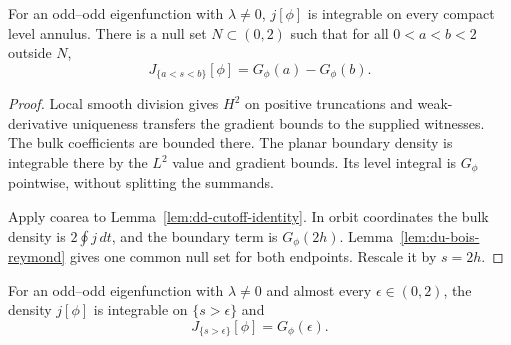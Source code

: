 \begin{lemma}
\label{lem:dd-annular-virial}
\leanok
For an odd--odd eigenfunction with $\lambda\ne0$, $j[\phi]$ is integrable
on every compact level annulus. There is a null set $N\subset(0,2)$ such
that for all $0<a<b<2$ outside $N$,
\[
 J_{\{a<s<b\}}[\phi]=G_\phi(a)-G_\phi(b).
\]
\end{lemma}

\begin{proof}
\leanok
Local smooth division gives $H^2$ on positive truncations and
weak-derivative uniqueness transfers the gradient bounds to the supplied
witnesses. The bulk coefficients are bounded there. The planar boundary
density is integrable there by the $L^2$ value and gradient bounds.
Its level integral is $G_\phi$ pointwise, without splitting the summands.

Apply coarea to Lemma~\ref{lem:dd-cutoff-identity}. In orbit coordinates
the bulk density is $2\oint j\,dt$, and the boundary term is
$G_\phi(2h)$. Lemma~\ref{lem:du-bois-reymond} gives one common null set
for both endpoints. Rescale it by $s=2h$.
\end{proof}

\begin{lemma}
\label{lem:dd-truncated-virial}
\leanok
For an odd--odd eigenfunction with $\lambda\ne0$ and almost every
$\epsilon\in(0,2)$, the density $j[\phi]$ is integrable on $\{s>\epsilon\}$
and
\[
 J_{\{s>\epsilon\}}[\phi]=G_\phi(\epsilon).
\]
\end{lemma}

